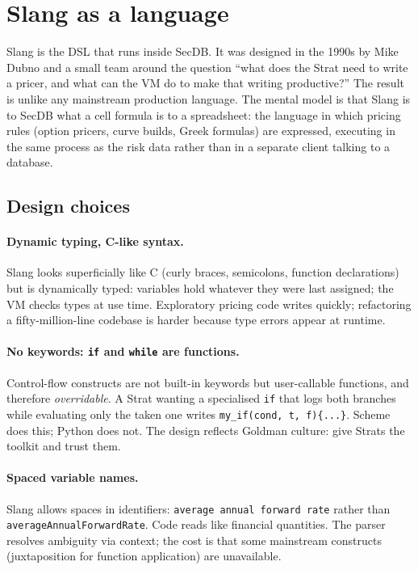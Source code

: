 \section{Slang as a language}
\label{sec:slang}

Slang is the DSL that runs inside SecDB.  It was designed in the
1990s by Mike Dubno and a small team around the question ``what
does the Strat need to write a pricer, and what can the VM do to
make that writing productive?''  The result is unlike any
mainstream production language.  The mental model is that Slang is
to SecDB what a cell formula is to a spreadsheet: the language in
which pricing rules (option pricers, curve builds, Greek
formulas) are expressed, executing in the same process as the risk
data rather than in a separate client talking to a database.

\subsection{Design choices}

\paragraph{Dynamic typing, C-like syntax.}  Slang looks
superficially like C (curly braces, semicolons, function
declarations) but is dynamically typed: variables hold whatever
they were last assigned; the VM checks types at use time.
Exploratory pricing code writes quickly; refactoring a
fifty-million-line codebase is harder because type errors appear
at runtime.

\paragraph{No keywords: \texttt{if} and \texttt{while} are
functions.}  Control-flow constructs are not built-in keywords
but user-callable functions, and therefore \emph{overridable}.  A
Strat wanting a specialised \texttt{if} that logs both branches
while evaluating only the taken one writes
\texttt{my\_if(cond, t, f)\{...\}}.  Scheme does this; Python does
not.  The design reflects Goldman culture: give Strats the
toolkit and trust them.

\paragraph{Spaced variable names.}  Slang allows spaces in
identifiers: \texttt{average annual forward rate} rather than
\texttt{averageAnnualForwardRate}.  Code reads like financial
quantities.  The parser resolves ambiguity via context; the cost
is that some mainstream constructs (juxtaposition for function
application) are unavailable.


